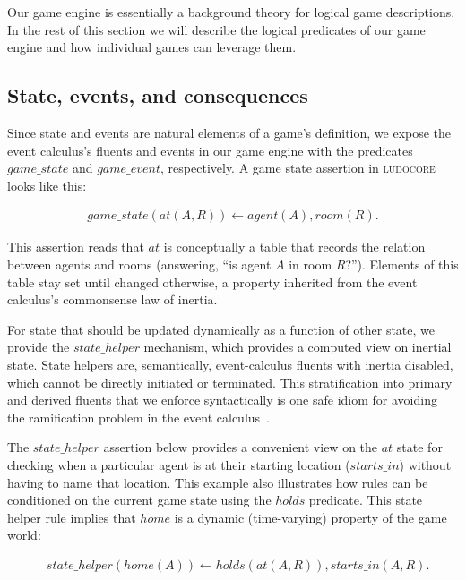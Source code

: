 \documentclass[letterpaper]{article}
\newcommand{\ludocore}{\textsc{ludocore}}
\newcommand{\snippet}[1]{{\vspace{-0.4cm}\footnotesize\begin{align*}#1\end{align*}\vspace{-0.4cm}}}
\newcommand{\logical}[1]{$#1$}
\begin{document}
Our game engine is essentially a background theory for logical game
descriptions. In the rest of this section we will describe the logical
predicates of our game engine and how individual games can leverage them.


\subsection{State, events, and consequences}

Since state and events are natural elements of a game's definition, we expose
the event calculus's fluents and events in our game engine with the predicates
\logical{game\_state} and \logical{game\_event}, respectively.  A game state
assertion in \ludocore{} looks like this:

\snippet{game\_state(at(A,R)) \leftarrow agent(A), room(R).}

This assertion reads that \logical{at} is conceptually a table that records the
relation between agents and rooms (answering, ``is agent $A$ in room $R$?'').
Elements of this table stay set until changed otherwise, a property inherited
from the event calculus's commonsense law of inertia.

For state that should be updated dynamically as a function of other state, we
provide the \logical{state\_helper} mechanism, which provides a computed view on
inertial state. State helpers are, semantically, event-calculus fluents with
inertia disabled, which cannot be directly initiated or terminated. This
stratification into primary and derived fluents that we enforce syntactically
is one safe idiom for avoiding the ramification problem in the event
calculus~\citep{Shanahan:ramification}.

The \logical{state\_helper} assertion below provides a convenient view on the
\logical{at} state for checking when a particular agent is at their starting
location (\logical{starts\_in}) without having to name that location. This
example also illustrates how rules can be conditioned on the current game state
using the \logical{holds} predicate. This state helper rule implies that
\logical{home} is a dynamic (time-varying) property of the game world:

\snippet{&state\_helper(home(A)) \leftarrow holds(at(A,R)), starts\_in(A,R).}
\end{document}

